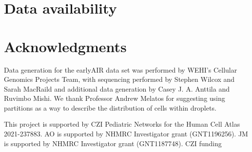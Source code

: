\documentclass[unnumsec,webpdf,modern,large]{oup-authoring-template}
\begin{document}
	
	
	\section{Data availability}
	\label{sec:data availability}
	
	
	
	\section{Acknowledgments}
	\label{acknowledgements}
	
	Data generation for the earlyAIR data set was performed by WEHI’s Cellular Genomics Projects Team, with sequencing performed by Stephen Wilcox and Sarah MacRaild and additional data generation by Casey J. A. Anttila and Ruvimbo Mishi.
	We thank Professor Andrew Melatos for suggesting using partitions as a way to describe the distribution of cells within droplets. 
	
	This project is supported by CZI Pediatric Networks for the Human Cell Atlas 2021-237883.
	AO is supported by NHMRC Investigator grant (GNT1196256). 
	JM is supported by NHMRC Investigator grant (GNT1187748). CZI funding 
	
	
	
	 
	
	
	
	
	
\end{document}
